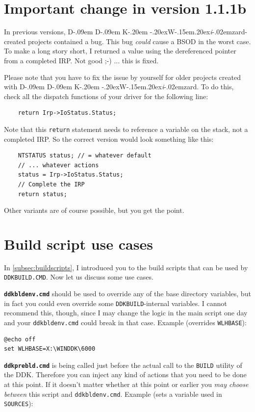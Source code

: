 \documentclass[a4paper,titlepage]{report}
\def\ddkwiz{D\kern-.09em D\kern-.09em K\kern-.20em \raise-.20ex\hbox{W}\kern-.15em\raise.20ex\hbox{\it{i}}\kern-.02em{zard}}
\begin{document}
\section{Important change in version 1.1.1b}
In previous versions, \ddkwiz{}-created projects contained a bug. This bug \emph{could}
cause a BSOD in the worst case. To make a long story short, I returned a value using
the dereferenced pointer from a completed IRP. Not good \textsf{;-)} ... this is fixed.

Please note that you have to fix the issue by yourself for older projects created
with \ddkwiz{}. To do this, check all the dispatch functions of your driver for the
following line:

\begin{verbatim}
    return Irp->IoStatus.Status;
\end{verbatim}

Note that this \texttt{return} statement needs to reference a variable on the stack, not a completed
IRP. So the correct version would look something like this:

\begin{verbatim}
    NTSTATUS status; // = whatever default
    // ... whatever actions
    status = Irp->IoStatus.Status;
    // Complete the IRP
    return status;
\end{verbatim}

Other variants are of course possible, but you get the point.

\section{Build script use cases}
In \autoref{subsec:buildscripts}, I introduced you to the build scripts that can be used by
\texttt{DDKBUILD.CMD}. Now let us discuss some use cases.

\textbf{\texttt{ddkbldenv.cmd}} should be used to override any of the base directory variables, but
in fact you could even override some \texttt{DDKBUILD}-internal variables. I cannot recommend
this, though, since I may change the logic in the main script one day and your \texttt{ddkbldenv.cmd}
could break in that case. Example (overrides \texttt{WLHBASE}):

\begin{verbatim}
@echo off
set WLHBASE=X:\WINDDK\6000
\end{verbatim}

\textbf{\texttt{ddkprebld.cmd}} is being called just before the actual call to the \texttt{BUILD}
utility of the DDK. Therefore you can inject any kind of actions that you need to be done at this
point. If it doesn't matter whether at this point or earlier you \emph{may choose between} this script
and \texttt{ddkbldenv.cmd}. Example (sets a variable used in \texttt{SOURCES}):
\end{document}
